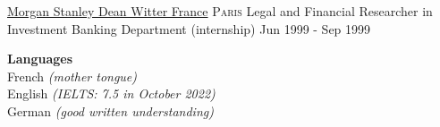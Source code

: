 \documentclass[10pt,a4paper]{article}
\begin{document}
\headedsection  %
   {\href{http://www.morganstanley.com/}{Morgan Stanley Dean Witter France}}
  {\textsc{Paris}} {%
  \headedsubsection
    {Legal and Financial Researcher in Investment Banking Department (internship)}
    {Jun 1999 - Sep 1999}
    {}}


%
%


\spacedhrule{1em}{-0.4em}


\vspace{0.5em}  
\headedsection
  {\textbf{Languages}}
  {\\ French \emph{(mother tongue)} \\English \emph{(IELTS: 7.5 in October 2022)} \\ German \emph{(good written understanding)}}
  

\vspace{0.5em}  
  
\end{document}

